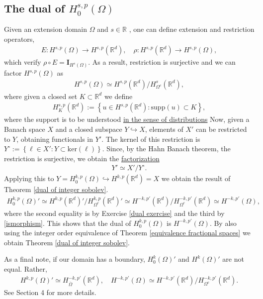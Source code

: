 \documentclass[
    a4paper,
    DIV=14,
    abstract=true,
    numbers=noenddot
]
{scrartcl}
\theoremstyle{definition}
\newcommand{\set}[1]{\left\{#1\right\}}
\newcommand{\Id}{\bm{I}}\renewcommand{\ker}{\bm{ker}}\newcommand{\supp}[1]{\bm{supp}(#1)}\renewcommand{\tr}[1]{\mathrm{tr}\left(#1\right)}
\newcommand{\rm}[1]{\mathrm{#1}}
\newcommand{\R}{\mathbb{R}}
\begin{document}
\subsection{The dual of $H^{s,p}_0(\Omega)$}
Given an extension domain $\Omega $ and $s \in \R$ , one can define extension and restriction operators,
\begin{align*}
    E:H^{s,p}(\Omega ) \to H^{s,p}(\R^d), \quad \rho: H^{s,p}(\R^d) \to H^{s,p}(\Omega ),
\end{align*}
which verify $\rho \circ E = \Id_{H^s(\Omega )}$. As a result, restriction is surjective and we can factor $H^{s,p}(\Omega )$ as
\begin{align}\label{ismorphism}
    H^{s,p}(\Omega )\simeq H^{s,p}(\R^d)\slash H^s_{\Omega^c}(\R^d ),
\end{align}
where given a closed set $K \subset \R^d$ we define
\begin{align*}
    H^{s,p}_K(\R^d):= \set{u \in H^{s,p}(\R^d): \rm{supp}(u) \subset K},
\end{align*}
where the support is to be understood \href{https://nowheredifferentiable.com/2023-07-12-PDEs-3-Sobolev_spaces/#:~:text=Support%20of%20a%20distribution}{in the sense of distributions}
Now, given a Banach space $X$ and a closed subspace $Y \hookrightarrow X$, elements of $X'$ can be restricted to $Y$, obtaining functionals in $Y'$. The kernel of this restriction is $Y^\circ:=\set{\ell \in X': Y \subset \rm{ker}(\ell)}$. Since, by the Hahn Banach theorem, the restriction is surjective, we obtain the \href{https://math.la.asu.edu/~quigg/teach/courses/578/2008/notes/adjoints.pdf}{factorization}
\begin{align}\label{dual isomormphism}
    Y' \simeq X'\slash Y^\circ.
\end{align}
Applying this to $Y= H^{k,p}_0(\Omega )\hookrightarrow H^{k,p}(\R^d) =X$ we obtain the result of Theorem \ref{dual of integer sobolev}.
\begin{align*}
    H^{k,p}_0(\Omega )' \simeq H^{k,p}(\R^d)'\slash H^{k,p}_{\Omega^c}(\R^d)'\simeq H^{-k,p'}(\R^d)\slash H^{-k,p'}_{\Omega^c}(\R^d )\simeq H^{-k,p'}(\Omega ),
\end{align*}
where the second equality is by Exercise \ref{dual exercise} and the third by \eqref{ismorphism}.
This shows that the dual of $H^{k,p}_0(\Omega )$ is $H^{-k,p'}(\Omega )$. By also using the integer order equivalence of Theorem \ref{equivalence fractional spaces} we obtain  Theorem \ref{dual of integer sobolev}.

As a final note, if our domain has a boundary, $H_0^k(\Omega )'$ and $H^k(\Omega )'$ are not equal. Rather,
\begin{align*}
    H^{k,p}(\Omega )'\simeq H_{\overline{\Omega } }^{-k,p'}(\R^d), \quad H^{-k,p'}(\Omega ) \simeq H^{-k,p'}(\R^d)\slash H^{-k,p'}_{{\Omega }^c }(\R^d).
\end{align*}
See \cite{taylor2013partial} Section 4 for more details.
\end{document}
